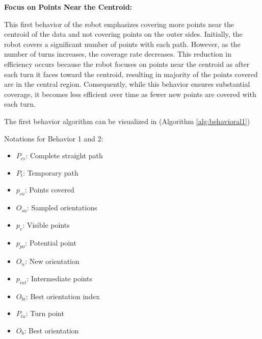 \vspace*{6mm}  

\textbf{Focus on Points Near the Centroid:}

This first behavior of the robot emphasizes covering more points near the centroid of the data and not covering points on the outer sides. Initially, the robot covers a significant number of points with each path. However, as the number of turns increases, the coverage rate decreases. This reduction in efficiency occurs because the robot focuses on points near the centroid as after each turn it faces toward the centroid, resulting in majority of the points covered are in the central region. Consequently, while this behavior ensures substantial coverage, it becomes less efficient over time as fewer new points are covered with each turn.

\vspace*{6mm}  


The first behavior algorithm can be visualized in (Algorithm \autoref{alg:behavioral1})

\vspace*{6mm}  

Notations for Behavior 1 and 2:
\begin{multicols}{2}
    \begin{itemize}[noitemsep,topsep=0pt]
        \item $P_{cs}$: Complete straight path
        \item $P_{t}$: Temporary path
        \item $p_{co}$: Points covered
        \item $O_{sa}$: Sampled orientations
        \item $p_v$: Visible points
        \item $p_{po}$: Potential point
        \item $O_n$: New orientation
        \item $p_{int}$: Intermediate points
        \item $O_{bi}$: Best orientation index
        \item $P_{tu}$: Turn point
        \item $O_b$: Best orientation
    \end{itemize}
\end{multicols}

